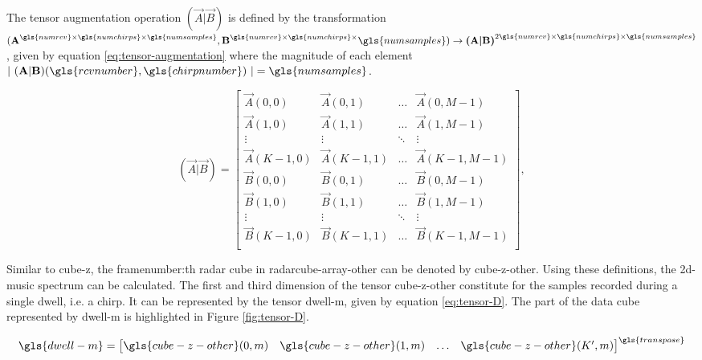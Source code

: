 The tensor augmentation operation $(\vec{A} | \vec{B})$ is defined by the transformation \\
$(\vec{A}^{\gls{numrcv} \times \gls{numchirps} \times \gls{numsamples}}, \vec{B}^{\gls{numrcv} \times \gls{numchirps} \times } \gls{numsamples}) \to \vec{(A|B)}^{2\gls{numrcv} \times \gls{numchirps} \times \gls{numsamples}}$, given by
equation \ref{eq:tensor-augmentation} where the magnitude of each element $|~(\vec{A}|\vec{B})(\gls{rcvnumber}, \gls{chirpnumber})~| = \gls{numsamples}$.

\begin{equation}
\label{eq:tensor-augmentation}
    (\vec{A} | \vec{B}) =
    \begin{bmatrix}
        \vec{A}(0, 0) & \vec{A}(0, 1) & \ldots & \vec{A}(0, M-1) \\
        \vec{A}(1, 0) & \vec{A}(1, 1) & \ldots & \vec{A}(1, M-1) \\
        \vdots        & \vdots        & \ddots & \vdots        \\
        \vec{A}(K-1, 0) & \vec{A}(K-1, 1) & \ldots & \vec{A}(K-1, M-1) \\
        \vec{B}(0, 0) & \vec{B}(0, 1) & \ldots & \vec{B}(0, M-1) \\
        \vec{B}(1, 0) & \vec{B}(1, 1) & \ldots & \vec{B}(1, M-1) \\
        \vdots        & \vdots        & \ddots & \vdots        \\
        \vec{B}(K-1, 0) & \vec{B}(K-1, 1) & \ldots & \vec{B}(K-1, M-1) \\
    \end{bmatrix},
\end{equation}

Similar to \gls{cube-z}, the \gls{framenumber}:th radar cube in \gls{radarcube-array-other} can be denoted by \gls{cube-z-other}.
Using these definitions, the \gls{2d-music} spectrum can be calculated.
The first and third dimension of the tensor \gls{cube-z-other} constitute for the samples recorded during a single dwell,
i.e. a chirp. It can be represented by the tensor \gls{dwell-m}, given by equation \ref{eq:tensor-D}.
The part of the data cube represented by \gls{dwell-m} is highlighted in Figure \ref{fig:tensor-D}.

\begin{equation}
\label{eq:tensor-D}
    \gls{dwell-m} = \begin{bmatrix} \gls{cube-z-other}(0, m) & \gls{cube-z-other}(1, m) & \ldots & \gls{cube-z-other}(K^{\prime}, m)  \end{bmatrix}^{\gls{transpose}}
\end{equation}

